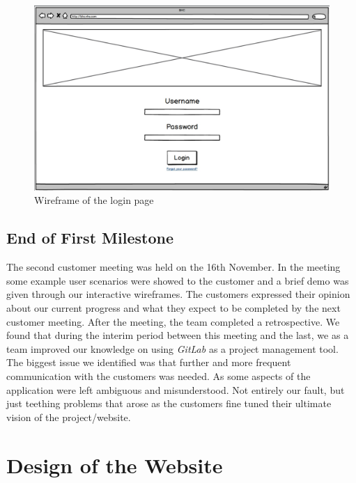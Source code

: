 \documentclass{l3proj}
\begin{document}
\begin{figure}[ht]
\centerline{\includegraphics[width=\textwidth, height=\textheight, keepaspectratio]{wireframe.png}}
\caption{Wireframe of the login page}
\label{fig:initialWireframe}
\end{figure}

\subsection{End of First Milestone}
\label{sec:milestone1}

The second customer meeting was held on the 16th November. In the meeting some example user scenarios were showed to the customer and a brief demo was given through our interactive wireframes. The customers expressed their opinion about our current progress and what they expect to be completed by the next customer meeting. After the meeting, the team completed a retrospective. We found that during the interim period between this meeting and the last, we as a team improved our knowledge on using \textit{GitLab} as a project management tool. The biggest issue we identified was that further and more frequent communication with the customers was needed. As some aspects of the application were left ambiguous and misunderstood. Not entirely our fault, but just teething problems that arose as the customers fine tuned their ultimate vision of the project/website.

\section{Design of the Website}
\label{sec:design}
\end{document}
